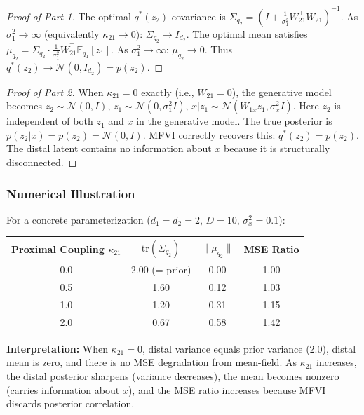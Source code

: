 \documentclass[10pt]{article} %
\theoremstyle{plain}
\theoremstyle{definition}
\begin{document}
\begin{proof}[Proof of Part 1]
The optimal $q^*(z_2)$ covariance is $\Sigma_{q_2} = \left(I + \frac{1}{\sigma_1^2}W_{21}^\top W_{21}\right)^{-1}$. As $\sigma_1^2 \to \infty$ (equivalently $\kappa_{21} \to 0$): $\Sigma_{q_2} \to I_{d_2}$. The optimal mean satisfies $\mu_{q_2} = \Sigma_{q_2} \cdot \frac{1}{\sigma_1^2}W_{21}^\top \mathbb{E}_{q_1}[z_1]$. As $\sigma_1^2 \to \infty$: $\mu_{q_2} \to 0$. Thus $q^*(z_2) \to \mathcal{N}(0, I_{d_2}) = p(z_2)$.
\end{proof}

\begin{proof}[Proof of Part 2]
When $\kappa_{21} = 0$ exactly (i.e., $W_{21} = 0$), the generative model becomes $z_2 \sim \mathcal{N}(0, I)$, $z_1 \sim \mathcal{N}(0, \sigma_1^2 I)$, $x | z_1 \sim \mathcal{N}(W_{1x}z_1, \sigma_x^2 I)$. Here $z_2$ is independent of both $z_1$ and $x$ in the generative model. The true posterior is $p(z_2 | x) = p(z_2) = \mathcal{N}(0, I)$. MFVI correctly recovers this: $q^*(z_2) = p(z_2)$. The distal latent contains no information about $x$ because it is structurally disconnected.
\end{proof}

\subsubsection{Numerical Illustration}

For a concrete parameterization ($d_1 = d_2 = 2$, $D = 10$, $\sigma_x^2 = 0.1$):

\begin{center}
\begin{tabular}{cccc}
\toprule
Proximal Coupling $\kappa_{21}$ & $\text{tr}(\Sigma_{q_2})$ & $\|\mu_{q_2}\|$ & MSE Ratio \\
\midrule
0.0 & 2.00 (= prior) & 0.00 & 1.00 \\
0.5 & 1.60 & 0.12 & 1.03 \\
1.0 & 1.20 & 0.31 & 1.15 \\
2.0 & 0.67 & 0.58 & 1.42 \\
\bottomrule
\end{tabular}
\end{center}

\noindent \textbf{Interpretation:} When $\kappa_{21} = 0$, distal variance equals prior variance (2.0), distal mean is zero, and there is no MSE degradation from mean-field. As $\kappa_{21}$ increases, the distal posterior sharpens (variance decreases), the mean becomes nonzero (carries information about $x$), and the MSE ratio increases because MFVI discards posterior correlation.
\end{document}
